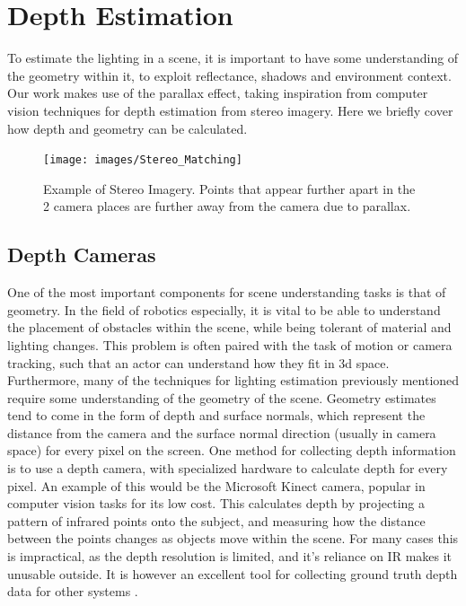 \documentclass[ %
                    author={Gavin Parker},
                supervisor={Dr. Neill Campbell},
                    degree={MEng},
                     title={Deep Siamese Networks for Illumination Estimation from Stereo Images},
                  subtitle={},
                      type={Research},
                      year={2018} ]{dissertation}
\begin{document}
\section{Depth Estimation}
To estimate the lighting in a scene, it is important to have some understanding of the geometry within it, to exploit reflectance, shadows and environment context. Our work makes use of the parallax effect, taking inspiration from computer vision techniques for depth estimation from stereo imagery. Here we briefly cover how depth and geometry can be calculated.
\begin{figure}[H]
\centering
\texttt{[image: images/Stereo\_Matching]}
\caption{Example of Stereo Imagery. Points that appear further apart in the 2 camera places are further away from the camera due to parallax.}
\end{figure}
\subsection{Depth Cameras}
One of the most important components for scene understanding tasks is that of geometry. In the field of robotics especially, it is vital to be able to understand the placement of obstacles within the scene, while being tolerant of material and lighting changes. This problem is often paired with the task of motion or camera tracking, such that an actor can understand how they fit in 3d space. Furthermore, many of the techniques for lighting estimation previously mentioned require some understanding of the geometry of the scene. Geometry estimates tend to come in the form of depth and surface normals, which represent the distance from the camera and the surface normal direction (usually in camera space) for every pixel on the screen.
\newline
One method for collecting depth information is to use a depth camera, with specialized hardware to calculate depth for every pixel. An example of this would be the Microsoft Kinect camera, popular in computer vision tasks for its low cost. This calculates depth by projecting a pattern of infrared points onto the subject, and measuring how the distance between the points changes as objects move within the scene. For many cases this is impractical, as the depth resolution is limited, and it's reliance on IR makes it unusable outside. It is however an excellent tool for collecting ground truth depth data for other systems \cite{Khoshelham_accuracyand}.
\newline
\end{document}
